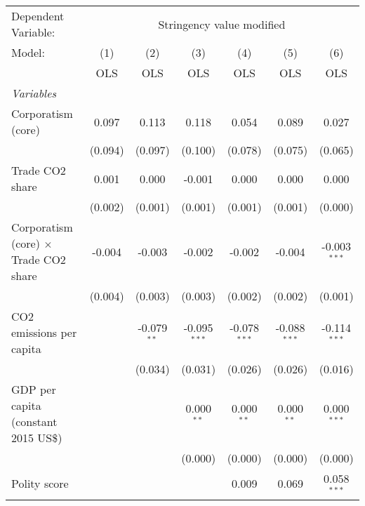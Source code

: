 
\begingroup
\centering
\begin{tabular}{lcccccc}
   \toprule
   Dependent Variable: & \multicolumn{6}{c}{Stringency value modified}\\
   Model:                                       & (1)     & (2)           & (3)            & (4)            & (5)            & (6)\\  
                                                &  OLS    & OLS           & OLS            & OLS            & OLS            & OLS\\  
   \midrule
   \emph{Variables}\\
   Corporatism (core)                           & 0.097   & 0.113         & 0.118          & 0.054          & 0.089          & 0.027\\   
                                                & (0.094) & (0.097)       & (0.100)        & (0.078)        & (0.075)        & (0.065)\\   
   Trade CO2 share                              & 0.001   & 0.000         & -0.001         & 0.000          & 0.000          & 0.000\\   
                                                & (0.002) & (0.001)       & (0.001)        & (0.001)        & (0.001)        & (0.000)\\   
   Corporatism (core) $\times$ Trade CO2 share  & -0.004  & -0.003        & -0.002         & -0.002         & -0.004         & -0.003$^{***}$\\   
                                                & (0.004) & (0.003)       & (0.003)        & (0.002)        & (0.002)        & (0.001)\\   
   CO2 emissions per capita                     &         & -0.079$^{**}$ & -0.095$^{***}$ & -0.078$^{***}$ & -0.088$^{***}$ & -0.114$^{***}$\\   
                                                &         & (0.034)       & (0.031)        & (0.026)        & (0.026)        & (0.016)\\   
   GDP per capita (constant 2015 US\$)          &         &               & 0.000$^{**}$   & 0.000$^{**}$   & 0.000$^{**}$   & 0.000$^{***}$\\   
                                                &         &               & (0.000)        & (0.000)        & (0.000)        & (0.000)\\   
   Polity score                                 &         &               &                & 0.009          & 0.069          & 0.058$^{***}$\\   

\end{tabular}
